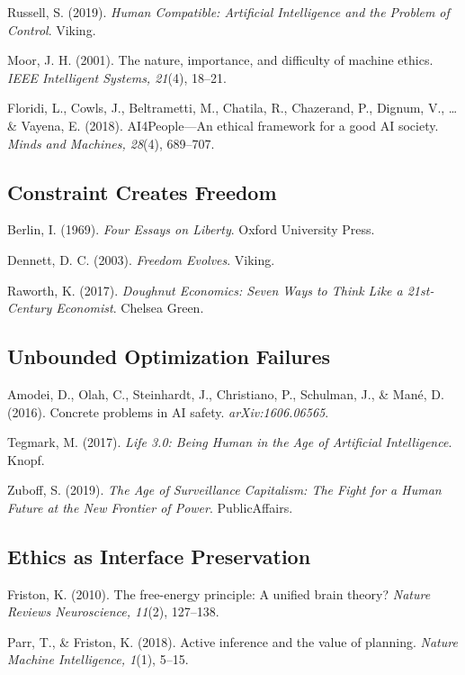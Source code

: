 \documentclass[
  openright]{book}
\begin{document}
Russell, S. (2019). \emph{Human Compatible: Artificial Intelligence and
the Problem of Control}. Viking.

Moor, J. H. (2001). The nature, importance, and difficulty of machine
ethics. \emph{IEEE Intelligent Systems, 21}(4), 18--21.

Floridi, L., Cowls, J., Beltrametti, M., Chatila, R., Chazerand, P.,
Dignum, V., \ldots{} \& Vayena, E. (2018). AI4People---An ethical
framework for a good AI society. \emph{Minds and Machines, 28}(4),
689--707.

\subsection{Constraint Creates
Freedom}\label{constraint-creates-freedom}

Berlin, I. (1969). \emph{Four Essays on Liberty}. Oxford University
Press.

Dennett, D. C. (2003). \emph{Freedom Evolves}. Viking.

Raworth, K. (2017). \emph{Doughnut Economics: Seven Ways to Think Like a
21st-Century Economist}. Chelsea Green.

\subsection{Unbounded Optimization
Failures}\label{unbounded-optimization-failures}

Amodei, D., Olah, C., Steinhardt, J., Christiano, P., Schulman, J., \&
Mané, D. (2016). Concrete problems in AI safety.
\emph{arXiv:1606.06565}.

Tegmark, M. (2017). \emph{Life 3.0: Being Human in the Age of Artificial
Intelligence}. Knopf.

Zuboff, S. (2019). \emph{The Age of Surveillance Capitalism: The Fight
for a Human Future at the New Frontier of Power}. PublicAffairs.

\subsection{Ethics as Interface
Preservation}\label{ethics-as-interface-preservation-1}

Friston, K. (2010). The free-energy principle: A unified brain theory?
\emph{Nature Reviews Neuroscience, 11}(2), 127--138.

Parr, T., \& Friston, K. (2018). Active inference and the value of
planning. \emph{Nature Machine Intelligence, 1}(1), 5--15.
\end{document}
